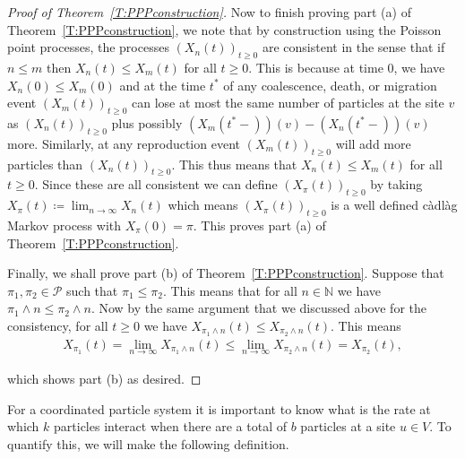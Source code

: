\documentclass[11pt]{article}
\theoremstyle{definition}
\newcommand{\N}{\mathbb{N}}
\newcommand{\thmref}[1]{Theorem~\ref{T:#1}}
\begin{document}
\begin{proof}[Proof of \thmref{PPPconstruction}]
    \noindent Now to finish proving part (a) of \thmref{PPPconstruction}, we note that by construction using the Poisson point processes, the processes $(X_n(t))_{t \geq 0}$ are consistent in the sense that if $n \leq m$ then $X_n(t) \leq X_m(t)$ for all $t \geq 0$. This is because at time $0$, we have $X_n(0) \leq X_m(0)$ and at the time $t^*$ of any coalescence, death, or migration event $(X_m(t))_{t\geq 0}$ can lose at most the same number of particles at the site $v$ as $(X_n(t))_{t\geq 0}$ plus possibly $(X_m(t^*-))(v) - (X_n(t^*-))(v)$ more. Similarly, at any reproduction event $(X_m(t))_{t\geq 0}$ will add more particles than $(X_n(t))_{t\geq 0}$. This thus means that $X_n(t) \leq X_m(t)$ for all $t \geq 0$. Since these are all consistent we can define $(X_\pi(t))_{t \geq 0}$ by taking $X_\pi(t) \coloneqq \lim_{n \to \infty} X_n(t)$ which means $(X_\pi(t))_{t \geq 0}$ is a well defined c\`adl\`ag Markov process with $X_\pi(0) = \pi$. This proves part (a) of \thmref{PPPconstruction}.
    \medskip

    \noindent Finally, we shall prove part (b) of \thmref{PPPconstruction}. Suppose that $\pi_1, \pi_2 \in \mathcal{P}$ such that $\pi_1 \leq \pi_2$. This means that for all $n \in \N$ we have $\pi_1 \wedge n \leq \pi_2 \wedge n$. Now by the same argument that we discussed above for the consistency, for all $t \geq 0$ we have $X_{\pi_1 \wedge n}(t) \leq X_{\pi_2 \wedge n}(t)$. This means
    \begin{align*}
        X_{\pi_1}(t) = \lim_{n \to \infty} X_{\pi_1 \wedge n}(t) \leq \lim_{n \to \infty} X_{\pi_2 \wedge n}(t) = X_{\pi_2}(t),
    \end{align*}

    \noindent which shows part (b) as desired.
\end{proof}


\noindent For a coordinated particle system it is important to know what is the rate at which $k$ particles interact when there are a total of $b$ particles at a site $u \in V$. To quantify this, we will make the following definition.
\end{document}
